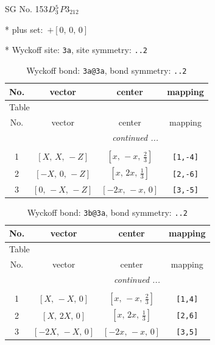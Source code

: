 \documentclass[fleqn,8pt]{jsarticle}
\begin{document}
\setcounter{MaxMatrixCols}{32}

\renewcommand{\tablename}{Table~}
\renewcommand{\figurename}{Figure~}
\begin{center}
\LARGE
SG No. 153\quad$D_{\rm 3}^{5}$\quad$P3_212$\quad[ trigonal ]
\end{center}

* plus set:\,\,\,$+\left[ 0,\, 0,\, 0 \right]$


* Wyckoff site: {\tt 3a}, site symmetry: {\tt ..2}
\renewcommand{\arraystretch}{1.2}
\begin{longtable}{cccc}
\caption{Wyckoff bond: {\tt 3a@3a}, bond symmetry: {\tt ..2}}
 \\
 \hline \hline
No. & vector & center & mapping \\ \hline \endfirsthead

\multicolumn{3}{l}{\tablename\ \thetable{}} \\
 \hline \hline
No. & vector & center & mapping \\ \hline \endhead

 \hline \hline
\multicolumn{3}{r}{\footnotesize\it continued ...} \\ \endfoot

 \hline \hline
\multicolumn{3}{r}{} \\ \endlastfoot

1 & $\left[ X,\, X,\, - Z \right]$ & $\left[ x,\, - x,\, \frac{2}{3} \right]$ & {\tt [1,-4]} \\ \hline
2 & $\left[ - X,\, 0,\, - Z \right]$ & $\left[ x,\, 2 x,\, \frac{1}{3} \right]$ & {\tt [2,-6]} \\ \hline
3 & $\left[ 0,\, - X,\, - Z \right]$ & $\left[ - 2 x,\, - x,\, 0 \right]$ & {\tt [3,-5]} \\
\end{longtable}
\renewcommand{\arraystretch}{1.2}
\begin{longtable}{cccc}
\caption{Wyckoff bond: {\tt 3b@3a}, bond symmetry: {\tt ..2}}
 \\
 \hline \hline
No. & vector & center & mapping \\ \hline \endfirsthead

\multicolumn{3}{l}{\tablename\ \thetable{}} \\
 \hline \hline
No. & vector & center & mapping \\ \hline \endhead

 \hline \hline
\multicolumn{3}{r}{\footnotesize\it continued ...} \\ \endfoot

 \hline \hline
\multicolumn{3}{r}{} \\ \endlastfoot

1 & $\left[ X,\, - X,\, 0 \right]$ & $\left[ x,\, - x,\, \frac{2}{3} \right]$ & {\tt [1,4]} \\ \hline
2 & $\left[ X,\, 2 X,\, 0 \right]$ & $\left[ x,\, 2 x,\, \frac{1}{3} \right]$ & {\tt [2,6]} \\ \hline
3 & $\left[ - 2 X,\, - X,\, 0 \right]$ & $\left[ - 2 x,\, - x,\, 0 \right]$ & {\tt [3,5]} \\
\end{longtable}
\end{document}
